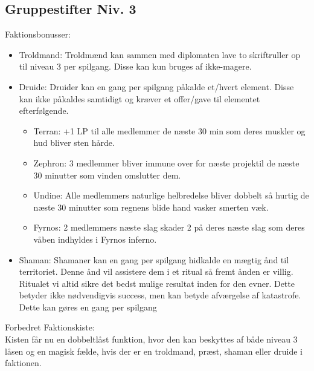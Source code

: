 \subsection*{Gruppestifter Niv. 3}

Faktionsbonusser:
\begin{itemize}
    \item Troldmand: Troldmænd kan sammen med diplomaten lave to skriftruller op til niveau 3 per spilgang. Disse kan kun bruges af ikke-magere.
    \item Druide: Druider kan en gang per spilgang påkalde et/hvert element. Disse kan ikke påkaldes samtidigt og kræver et offer/gave til elementet efterfølgende. 
    \begin{itemize}
        \item Terran: +1 LP til alle medlemmer de næste 30 min som deres muskler og hud bliver sten hårde.
        \item Zephron: 3 medlemmer bliver immune over for næste projektil de næste 30 minutter som vinden omslutter dem.
        \item Undine: Alle medlemmers naturlige helbredelse bliver dobbelt så hurtig de næste 30 minutter som regnens blide hand vasker smerten væk.
        \item Fyrnos: 2 medlemmers næste slag skader 2 på deres næste slag som deres våben indhyldes i Fyrnos inferno.
    \end{itemize}
    \item Shaman: Shamaner kan en gang per spilgang hidkalde en mægtig ånd til territoriet. Denne ånd vil assistere dem i et ritual så fremt ånden er villig. Ritualet vi altid sikre det bedst mulige resultat inden for den evner. Dette betyder ikke nødvendigvis success, men kan betyde afværgelse af katastrofe. Dette kan gøres en gang per spilgang
\end{itemize}

Forbedret Faktionskiste:\\
Kisten får nu en dobbeltlåst funktion, hvor den kan beskyttes af både niveau 3 låsen og en magisk fælde, hvis der er en troldmand, præst, shaman eller druide i faktionen. 




